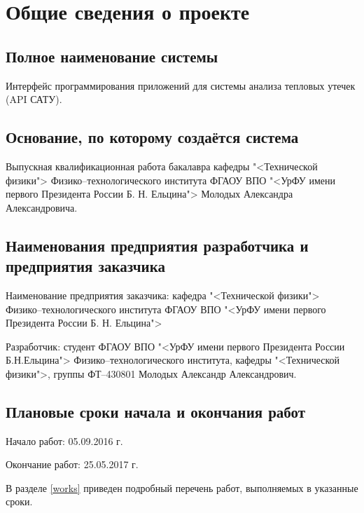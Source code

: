 \chapter{\enskip Общие сведения о проекте}

\section{\enskip Полное наименование системы}

\par
	Интерфейс программирования приложений для системы анализа тепловых утечек (API САТУ).

\section{\enskip Основание, по которому создаётся система}

\par
	Выпускная квалификационная работа бакалавра кафедры "<Технической физики"> Физико–технологи­ческого института ФГАОУ ВПО "<УрФУ имени первого Президента России Б. Н. Ельцина"> Молодых Александра Александровича.

\section{\enskip \nohyphens{Наименования предприятия разработчика и предприятия заказчика}}

\par
	Наименование предприятия заказчика: кафедра "<Технической физики"> Физико–технологи­ческого института ФГАОУ ВПО "<УрФУ имени первого Президента России Б. Н. Ельцина">

	Разработчик: студент ФГАОУ ВПО "<УрФУ имени первого Президента России Б.Н.Ельцина"> Физико–технологического института, кафедры "<Технической физики">, группы ФТ–430801 Молодых Александр Александрович.

\section{\enskip Плановые сроки начала и окончания работ}
	Начало работ: 05.09.2016 г.
	
	Окончание работ: 25.05.2017 г.
 
	В разделе \ref{works} приведен подробный перечень работ, выполняемых в указанные сроки.
